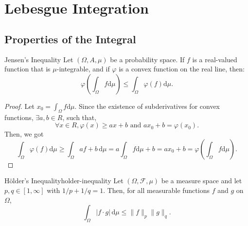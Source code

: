 \chapter{Lebesgue Integration}

\section{Properties of the Integral}

\begin{theorem}{Jensen's Inequality}{}
    Let $(\Omega,A,\mu)$ be a probability space. If $f$ is a real-valued function that is $\mu$-integrable, and if $\varphi$ is a convex function on the real line, then:
    \begin{equation}
        \varphi\left(\int_{\Omega}f\mathrm{d}\mu\right)\leq\int_{\Omega}\varphi(f)\mathrm{d}\mu.
    \end{equation}
\end{theorem}

\begin{proof}
    Let $x_{0}=\int_{\Omega}f\mathrm{d}\mu$. Since the existence of subderivatives for convex functions, $\exists a,b\in R$, such that,
    \begin{equation*}
        \forall x\in R,\varphi(x)\geq ax+b\text{ and }ax_0+b=\varphi(x_0).
    \end{equation*}
    Then, we got
    \begin{equation*}
        \int_{\Omega}\varphi(f)\mathrm{d}\mu\geq\int_{\Omega}af+b\,\mathrm{d}\mu=a\int_{\Omega}f\mathrm{d}\mu+b=ax_0+b=\varphi\left(\int_{\Omega}f\mathrm{d}\mu\right).
    \end{equation*}
\end{proof}

\begin{theorem}{H\"older's Inequality}{holder-inequality}
    Let $(\Omega,\mathcal{F},\mu)$ be a measure space and let $p,q\in[1,\infty]$ with $1/p+1/q=1$. Then, for all measurable functions $f$ and $g$ on $\Omega$,
    \begin{equation}
        \int_{\Omega}|f\cdot g|\,\mathrm{d}\mu\leq\|f\|_{p}\|g\|_{q}.
    \end{equation}
\end{theorem}

